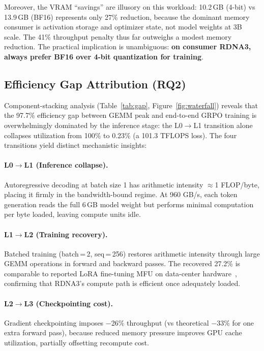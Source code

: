 Moreover, the VRAM ``savings'' are illusory on this workload: 10.2\,GB (4-bit) vs 13.9\,GB (BF16) represents only 27\% reduction, because the dominant memory consumer is activation storage and optimizer state, not model weights at 3B scale. The 41\% throughput penalty thus far outweighs a modest memory reduction. The practical implication is unambiguous: \textbf{on consumer RDNA3, always prefer BF16 over 4-bit quantization for training}.

\subsection{Efficiency Gap Attribution (RQ2)}

Component-stacking analysis (Table~\ref{tab:gap}, Figure~\ref{fig:waterfall}) reveals that the 97.7\% efficiency gap between GEMM peak and end-to-end GRPO training is overwhelmingly dominated by the inference stage: the L0$\rightarrow$L1 transition alone collapses utilization from 100\% to 0.23\% (a 101.3 TFLOPS loss). The four transitions yield distinct mechanistic insights:

\paragraph{L0$\rightarrow$L1 (Inference collapse).} Autoregressive decoding at batch size 1 has arithmetic intensity $\approx$1 FLOP/byte, placing it firmly in the bandwidth-bound regime. At 960 GB/s, each token generation reads the full 6\,GB model weight but performs minimal computation per byte loaded, leaving compute units idle.

\paragraph{L1$\rightarrow$L2 (Training recovery).} Batched training (batch\,=\,2, seq\,=\,256) restores arithmetic intensity through large GEMM operations in forward and backward passes. The recovered 27.2\% \mfuprac{} is comparable to reported LoRA fine-tuning MFU on data-center hardware~\citep{hu2022lora}, confirming that RDNA3's compute path is efficient once adequately loaded.

\paragraph{L2$\rightarrow$L3 (Checkpointing cost).} Gradient checkpointing imposes $-$26\% throughput (vs theoretical $-$33\% for one extra forward pass), because reduced memory pressure improves GPU cache utilization, partially offsetting recompute cost.

